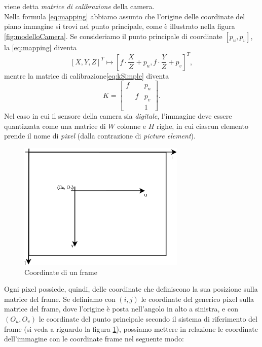 viene detta \textit{matrice di calibrazione} della camera.\\
Nella formula \eqref{eq:mapping} abbiamo assunto che l'origine delle coordinate del piano immagine si trovi nel punto principale, come \`e illustrato nella figura \ref{fig:modelloCamera}.
Se consideriamo il punto principale di coordinate $[p_u, p_v]$, la \eqref{eq:mapping} diventa
 \begin{equation}
 \label{eq:mappingGeneral}
 [X,Y,Z]^\textit{T} \mapsto \left[f\cdot \frac{X}{Z}+p_u, f\cdot \frac{Y}{Z}+p_v\right]^\textit{T},
 \end{equation}
 mentre la matrice di calibrazione\eqref{eq:kSimple} diventa 
 \begin{equation}
 \label{eq:kGeneral}
 K =
  \left[\begin{array}{rcl}
  f & & p_u \\
  & f & p_v \\
  & & 1 
  \end{array}\right].
 \end{equation}
 Nel caso in cui il sensore della camera sia \textit{digitale}, l'immagine deve essere quantizzata come una matrice di $W$ colonne e $H$ righe, in cui ciascun elemento prende il nome di \textit{pixel} (dalla contrazione di \textit{picture element}).
 \begin{figure}[tb]
 	\centering
 	\includegraphics[width=8cm]{./pictures/griglia}
 	\caption{Coordinate di un frame}
 	\label{fig:griglia}
 \end{figure}
 Ogni pixel possiede, quindi, delle coordinate che definiscono la sua posizione sulla matrice del frame.
 Se definiamo con $(i,j)$ le coordinate del generico pixel sulla matrice del frame, dove l'origine \`e posta nell'angolo in alto a sinistra, e con $(O_u, O_v)$ le coordinate del punto principale secondo il sistema di riferimento del frame (si veda a riguardo la figura \ref{fig:griglia}), possiamo mettere in relazione le coordinate dell'immagine con le coordinate frame nel seguente modo:
